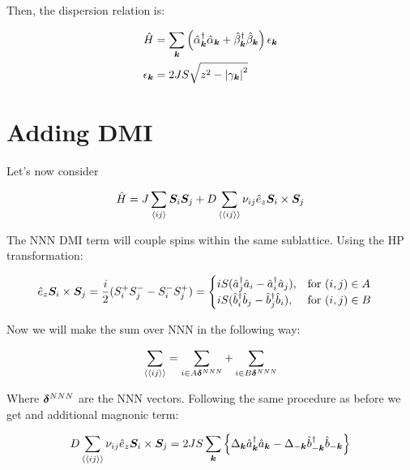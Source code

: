 Then, the dispersion relation is:

\begin{align}
\hat{H} &= \sum_{\boldsymbol{k}}\left( \hat{\alpha}_{\boldsymbol{k}}^\dagger \hat{\alpha}_{\boldsymbol{k}} +\hat{\beta}_{\boldsymbol{k}}^\dagger \hat{\beta}_{\boldsymbol{k}} \right) \epsilon_{\boldsymbol{k}} \\
\epsilon_{\boldsymbol{k}} &= 2JS \sqrt{z^2-\abs{\gamma_{\boldsymbol{k}}}^2}
\end{align}

\section{Adding DMI}

Let's now consider

\begin{equation}
\hat{H} = J \sum_{\langle i j \rangle} \boldsymbol{S}_i \boldsymbol{S}_j + D \sum_{\langle \langle i j \rangle \rangle} \nu_{ij}\hat{e}_z \boldsymbol{S}_i \times \boldsymbol{S}_j
\end{equation}

The NNN DMI term will couple spins within the same sublattice. Using the HP transformation:

\begin{equation}
\hat{e}_z \boldsymbol{S}_i \times \boldsymbol{S}_j = \frac{i}{2}(S_i^+S_j^--S_i^-S_j^+) = \begin{cases}
             iS(\hat{a}_j^\dagger\hat{a}_i-\hat{a}_i^\dagger\hat{a}_j),  & \text{for } (i,j) \in A \\
             iS(\hat{b}_i^\dagger\hat{b}_j-\hat{b}_j^\dagger\hat{b}_i),  & \text{for } (i,j) \in B
       \end{cases} \quad
\end{equation}

Now we will make the sum over NNN in the following way:

\begin{equation}
\sum_{\langle \langle i j \rangle \rangle} = \sum_{i\in A \boldsymbol{\delta}^{NNN}} +  \sum_{i\in B \boldsymbol{\delta}^{NNN}}
\end{equation}

Where $\boldsymbol{\delta}^{NNN}$ are the NNN vectors. Following the same procedure as before we get and additional magnonic term:

\begin{equation}
D \sum_{\langle \langle i j \rangle \rangle} \nu_{ij}\hat{e}_z \boldsymbol{S}_i \times \boldsymbol{S}_j = 2JS\sum_{\boldsymbol{k}} \left\{ \Delta_{\boldsymbol{k}}\hat{a}^\dagger_{\boldsymbol{k}}\hat{a}_{\boldsymbol{k}} - \Delta_{-\boldsymbol{k}}\hat{b}^\dagger_{-\boldsymbol{k}}\hat{b}_{-\boldsymbol{k}} \right\}
\end{equation}

